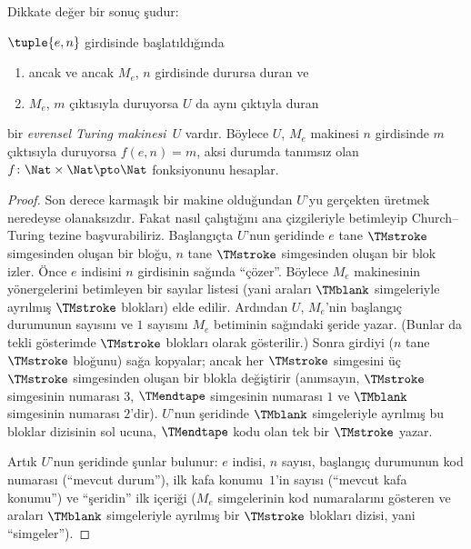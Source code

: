 Dikkate değer bir sonuç şudur:

\begin{thm} $\tuple{e,n}$ girdisinde
  başlatıldığında
  \begin{enumerate}
    \item ancak ve ancak $M_e$, $n$ girdisinde durursa duran ve
    \item $M_e$, $m$ çıktısıyla duruyorsa $U$ da aynı çıktıyla duran
  \end{enumerate}
  bir \emph{evrensel Turing makinesi}~$U$ vardır. Böylece $U$, $M_e$ makinesi
  $n$ girdisinde $m$ çıktısıyla duruyorsa $f(e,n)=m$, aksi durumda tanımsız
  olan $f\colon\Nat\times\Nat\pto\Nat$ fonksiyonunu hesaplar.
\end{thm}

\begin{proof}
  Son derece karmaşık bir makine olduğundan $U$'yu gerçekten üretmek
  neredeyse olanaksızdır. Fakat nasıl çalıştığını ana çizgileriyle betimleyip
  Church--Turing tezine başvurabiliriz. Başlangıçta $U$'nun şeridinde $e$
  tane $\TMstroke$ simgesinden oluşan bir bloğu, $n$ tane $\TMstroke$
  simgesinden oluşan bir blok izler. Önce $e$
  indisini $n$ girdisinin sağında ``çözer''. Böylece $M_e$ makinesinin
  yönergelerini betimleyen bir sayılar listesi (yani araları $\TMblank$
  simgeleriyle ayrılmış $\TMstroke$ blokları) elde edilir. Ardından $U$,
  $M_e$'nin başlangıç durumunun sayısını ve $1$ sayısını $M_e$ betiminin
  sağındaki şeride yazar. (Bunlar da tekli gösterimde $\TMstroke$ blokları
  olarak gösterilir.) Sonra girdiyi ($n$ tane $\TMstroke$ bloğunu) sağa
  kopyalar; ancak her $\TMstroke$ simgesini üç $\TMstroke$ simgesinden oluşan
  bir blokla değiştirir (anımsayın, $\TMstroke$ simgesinin numarası $3$,
  $\TMendtape$ simgesinin numarası $1$ ve $\TMblank$ simgesinin numarası
  $2$'dir). $U$'nun şeridinde $\TMblank$ simgeleriyle ayrılmış bu bloklar
  dizisinin sol ucuna, $\TMendtape$ kodu olan tek bir $\TMstroke$ yazar.

  Artık $U$'nun şeridinde şunlar bulunur: $e$ indisi, $n$ sayısı, başlangıç
  durumunun kod numarası (``mevcut durum''), ilk kafa konumu~$1$'in sayısı
  (``mevcut kafa konumu'') ve ``şeridin'' ilk içeriği ($M_e$ simgelerinin kod
  numaralarını gösteren ve araları $\TMblank$ simgeleriyle ayrılmış bir
  $\TMstroke$ blokları dizisi, yani ``simgeler'').


\end{proof}
